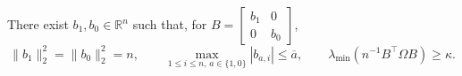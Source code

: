 There exist \(b_1,b_0\in\mathbb R^n\) such that, for \(B=\begin{bmatrix}b_1&0\\0&b_0\end{bmatrix}\),
\[
\lVert b_1\rVert_2^2=\lVert b_0\rVert_2^2=n,
\qquad
\max_{1\le i\le n,\,a\in\{1,0\}}|b_{a,i}|\le\overline a,
\qquad
\lambda_{\min}(n^{-1}B^{\top}\Omega B)\ge\kappa.
\]